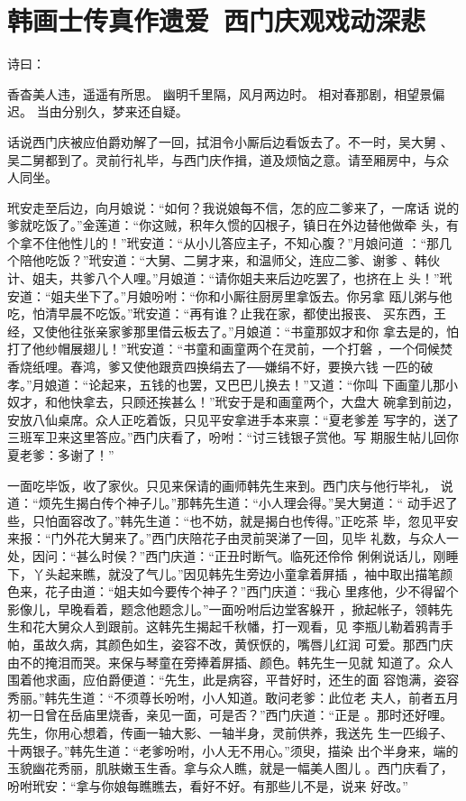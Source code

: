 \chapter{韩画士传真作遗爱~西门庆观戏动深悲}

诗曰：

香杳美人违，遥遥有所思。
幽明千里隔，风月两边时。
相对春那剧，相望景偏迟。
当由分别久，梦来还自疑。

话说西门庆被应伯爵劝解了一回，拭泪令小厮后边看饭去了。不一时，吴大舅
、吴二舅都到了。灵前行礼毕，与西门庆作揖，道及烦恼之意。请至厢房中，与众
人同坐。

玳安走至后边，向月娘说：“如何？我说娘每不信，怎的应二爹来了，一席话
说的爹就吃饭了。”金莲道：“你这贼，积年久惯的囚根子，镇日在外边替他做牵
头，有个拿不住他性儿的！”玳安道：“从小儿答应主子，不知心腹？”月娘问道
：“那几个陪他吃饭？”玳安道：“大舅、二舅才来，和温师父，连应二爹、谢爹
、韩伙计、姐夫，共爹八个人哩。”月娘道：“请你姐夫来后边吃罢了，也挤在上
头！”玳安道：“姐夫坐下了。”月娘吩咐：“你和小厮往厨房里拿饭去。你另拿
瓯儿粥与他吃，怕清早晨不吃饭。”玳安道：“再有谁？止我在家，都使出报丧、
买东西，王经，又使他往张亲家爹那里借云板去了。”月娘道：“书童那奴才和你
拿去是的，怕打了他纱帽展翅儿！”玳安道：“书童和画童两个在灵前，一个打磐
，一个伺候焚香烧纸哩。春鸿，爹又使他跟贲四换绢去了──嫌绢不好，要换六钱
一匹的破孝。”月娘道：“论起来，五钱的也罢，又巴巴儿换去！”又道：“你叫
下画童儿那小奴才，和他快拿去，只顾还挨甚么！”玳安于是和画童两个，大盘大
碗拿到前边，安放八仙桌席。众人正吃着饭，只见平安拿进手本来禀：“夏老爹差
写字的，送了三班军卫来这里答应。”西门庆看了，吩咐：“讨三钱银子赏他。写
期服生帖儿回你夏老爹：多谢了！”

一面吃毕饭，收了家伙。只见来保请的画师韩先生来到。西门庆与他行毕礼，
说道：“烦先生揭白传个神子儿。”那韩先生道：“小人理会得。”吴大舅道：“
动手迟了些，只怕面容改了。”韩先生道：“也不妨，就是揭白也传得。”正吃茶
毕，忽见平安来报：“门外花大舅来了。”西门庆陪花子由灵前哭涕了一回，见毕
礼数，与众人一处，因问：“甚么时侯？”西门庆道：“正丑时断气。临死还伶伶
俐俐说话儿，刚睡下，丫头起来瞧，就没了气儿。”因见韩先生旁边小童拿着屏插
，袖中取出描笔颜色来，花子由道：“姐夫如今要传个神子？”西门庆道：“我心
里疼他，少不得留个影像儿，早晚看着，题念他题念儿。”一面吩咐后边堂客躲开
，掀起帐子，领韩先生和花大舅众人到跟前。这韩先生揭起千秋幡，打一观看，见
李瓶儿勒着鸦青手帕，虽故久病，其颜色如生，姿容不改，黄恹恹的，嘴唇儿红润
可爱。那西门庆由不的掩泪而哭。来保与琴童在旁捧着屏插、颜色。韩先生一见就
知道了。众人围着他求画，应伯爵便道：“先生，此是病容，平昔好时，还生的面
容饱满，姿容秀丽。”韩先生道：“不须尊长吩咐，小人知道。敢问老爹：此位老
夫人，前者五月初一日曾在岳庙里烧香，亲见一面，可是否？”西门庆道：“正是
。那时还好哩。先生，你用心想着，传画一轴大影、一轴半身，灵前供养，我送先
生一匹缎子、十两银子。”韩先生道：“老爹吩咐，小人无不用心。”须臾，描染
出个半身来，端的玉貌幽花秀丽，肌肤嫩玉生香。拿与众人瞧，就是一幅美人图儿
。西门庆看了，吩咐玳安：“拿与你娘每瞧瞧去，看好不好。有那些儿不是，说来
好改。”


